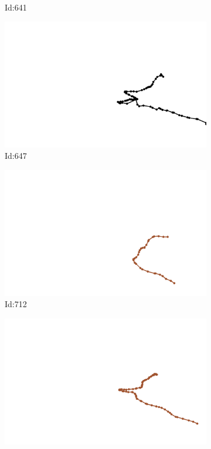 \documentclass[12pt,twoside]{report}
\begin{document}
\begin{figure}
\begin{subfigure}[b]{0.20\textwidth}
\caption{Id:641}
\end{subfigure}
\begin{subfigure}[b]{0.20\textwidth}
\centering
\includegraphics[width=\textwidth]{../trajectories/647.png}
\caption{Id:647}
\end{subfigure}
\begin{subfigure}[b]{0.20\textwidth}
\centering
\includegraphics[width=\textwidth]{../trajectories/712.png}
\caption{Id:712}
\end{subfigure}
\begin{subfigure}[b]{0.20\textwidth}
\centering
\includegraphics[width=\textwidth]{../trajectories/768.png}

\end{subfigure}
\end{figure}
\end{document}
